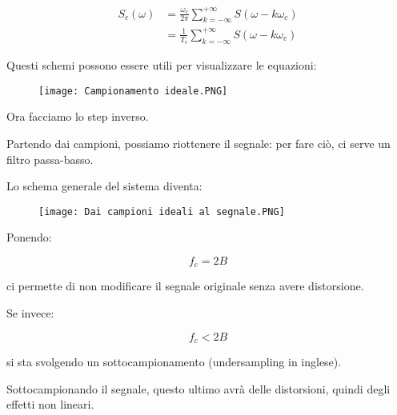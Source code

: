 {
    \Large 
    \begin{equation}
        \begin{split}
            S_c (\omega) 
            &= 
            \frac{\omega_c}{2 \pi} 
            \sum_{k = - \infty}^{ + \infty} 
            S(\omega - k \omega_c) 
            \\ 
            &= 
            \frac{1}{T_c} 
            \sum_{k = - \infty}^{ + \infty} 
            S(\omega - k \omega_c) 
        \end{split}
    \end{equation}
} 

Questi schemi possono essere utili per visualizzare le equazioni: 

\begin{figure}[h]
    \centering
    \texttt{[image: Campionamento ideale.PNG]}
\end{figure}  

\newpage 

Ora facciamo lo step inverso. \newline 

Partendo dai campioni, possiamo riottenere il segnale: per fare ciò, ci serve un filtro passa-basso. \newline 

Lo schema generale del sistema diventa: 

\begin{figure}[h]
    \centering
    \texttt{[image: Dai campioni ideali al segnale.PNG]}
\end{figure}  



Ponendo: 

{
    \Large 
    \begin{equation}
        f_c = 2B
    \end{equation}
} 

ci permette di non modificare il segnale originale senza avere distorsione. \newline 

Se invece: 

{
    \Large 
    \begin{equation}
        f_c < 2B
    \end{equation}
}

si sta svolgendo un sottocampionamento (undersampling in inglese). \newline 

Sottocampionando il segnale, questo ultimo avrà delle distorsioni, quindi degli effetti non lineari. \newline 

